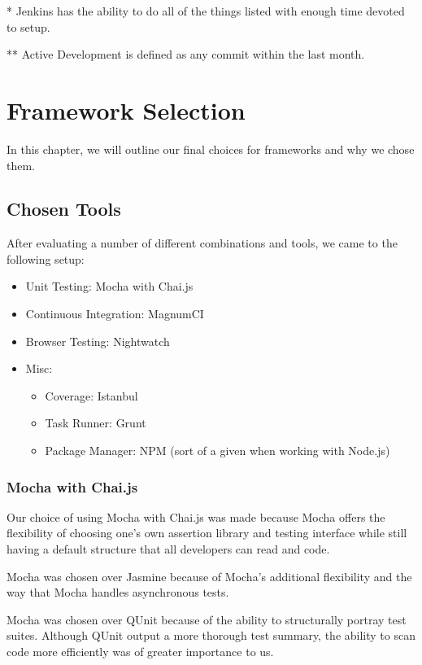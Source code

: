 \documentclass[12pt]{ucthesis}
\begin{document}
* Jenkins has the ability to do all of the things listed with enough time devoted to setup.

** Active Development is defined as any commit within the last month.

\normalsize
\chapter{Framework Selection}
In this chapter, we will outline our final choices for frameworks and why we chose them.

\section{Chosen Tools}
After evaluating a number of different combinations and tools, we came to the following setup:
\begin{itemize}
  \item Unit Testing: Mocha with Chai.js
  \item Continuous Integration: MagnumCI
  \item Browser Testing: Nightwatch
  \item Misc:
    \begin{itemize}
      \item Coverage: Istanbul
      \item Task Runner: Grunt
      \item Package Manager: NPM (sort of a given when working with Node.js)
    \end{itemize}
\end{itemize}

\subsection{Mocha with Chai.js}
Our choice of using Mocha with Chai.js was made because Mocha offers the flexibility of choosing one's own assertion library and testing interface while still having a default structure that all developers can read and code.

Mocha was chosen over Jasmine because of Mocha's additional flexibility and the way that Mocha handles asynchronous tests.

Mocha was chosen over QUnit because of the ability to structurally portray test suites. Although QUnit output a more thorough test summary, the ability to scan code more efficiently was of greater importance to us.
\end{document}
